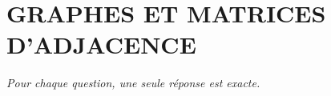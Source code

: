 
\section*{\textcolor{chapcolor}{\MakeUppercase{Graphes et matrices d'adjacence}}}

\begin{center}
\textit{Pour chaque question, une seule réponse est exacte.}
\end{center}

